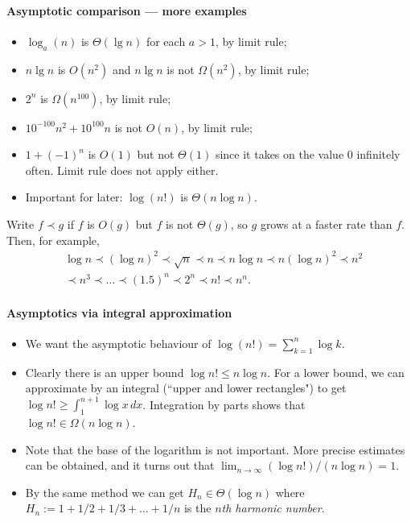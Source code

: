 \paragraph{Asymptotic comparison --- more examples}
\begin{itemize}
\item $\log_a(n)$ is $\Theta(\lg n)$ for each $a > 1$, by limit rule;
\item $n \lg n$ is $O(n^2)$ and $n \lg n$ is not $\Omega(n^2)$, by limit rule;
\item $2^n$ is $\Omega(n^{100})$, by limit rule;
\item $10^{-100} n^2 + 10^{100} n$ is not $O(n)$, by limit rule;
\item $1 + (-1)^n$ is $O(1)$ but not $\Theta(1)$ since it takes on the value $0$
 infinitely often. Limit rule does not apply either.
\item Important for later: $\log (n!)$ is $\Theta(n \log n)$. 
\end{itemize}
Write $f \prec g$ if $f$ is $O(g)$ but $f$ is not $\Theta(g)$, so $g$ grows at a
 faster rate than $f$. Then, for example, 
\begin{align*}
& \log n \prec (\log n)^2 \prec \sqrt{n} \prec n \prec n \log n 
 \prec n (\log n)^2 \prec n^2 \\
& \prec n^3 \prec \dots \prec (1.5)^n \prec 2^n \prec n! \prec n^n.
\end{align*}


\paragraph{Asymptotics via integral approximation}
\begin{itemize}
\item We want the asymptotic behaviour of $\log (n!) = \sum_{k=1}^n \log k$.
\item Clearly there is an upper bound $\log n! \leq n \log n$. For a lower bound, we 
can approximate by an integral (``upper and lower rectangles") to get 
$\log n! \geq \int_1^{n+1} \log x \, dx$. Integration by parts shows that 
$\log n! \in \Omega(n \log n)$.
\item Note that the base of the logarithm is not important. More precise estimates can 
be obtained, and it turns out that $\lim_{n\to \infty} (\log n!)/(n \log n) = 1$.
\item By the same method we can get $H_n \in \Theta(\log n)$ where 
$H_n:=1+ 1/2 + 1/3 + \dots + 1/n$ is the \emph{$n$th harmonic number}. 
\end{itemize}



